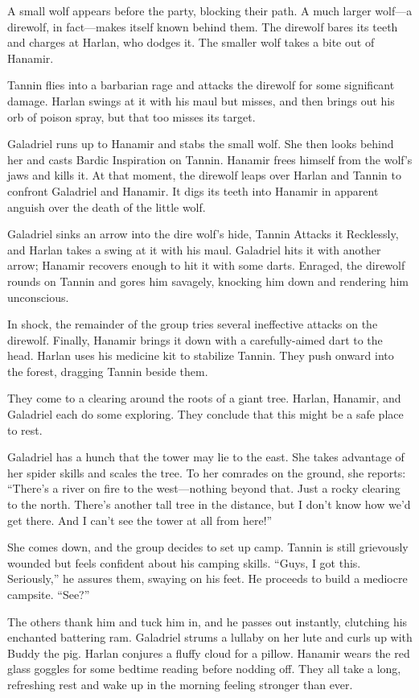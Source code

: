 \documentclass[smalldemyvopaper,11pt,twoside,onecolumn,openright,extrafontsizes]{memoir}
\begin{document}
A small wolf appears before the party, blocking their path. A much
larger wolf---a direwolf, in fact---makes itself known behind them. The
direwolf bares its teeth and charges at Harlan, who dodges it. The
smaller wolf takes a bite out of Hanamir.

Tannin flies into a barbarian rage and attacks the direwolf for some
significant damage. Harlan swings at it with his maul but misses, and
then brings out his orb of poison spray, but that too misses its target.

Galadriel runs up to Hanamir and stabs the small wolf. She then looks
behind her and casts Bardic Inspiration on Tannin. Hanamir frees himself
from the wolf's jaws and kills it. At that moment, the direwolf leaps
over Harlan and Tannin to confront Galadriel and Hanamir. It digs its
teeth into Hanamir in apparent anguish over the death of the little
wolf.

Galadriel sinks an arrow into the dire wolf's hide, Tannin Attacks it
Recklessly, and Harlan takes a swing at it with his maul. Galadriel hits
it with another arrow; Hanamir recovers enough to hit it with some
darts. Enraged, the direwolf rounds on Tannin and gores him savagely,
knocking him down and rendering him unconscious.

In shock, the remainder of the group tries several ineffective attacks
on the direwolf. Finally, Hanamir brings it down with a carefully-aimed
dart to the head. Harlan uses his medicine kit to stabilize Tannin. They
push onward into the forest, dragging Tannin beside them.

They come to a clearing around the roots of a giant tree. Harlan,
Hanamir, and Galadriel each do some exploring. They conclude that this
might be a safe place to rest.

Galadriel has a hunch that the tower may lie to the east. She takes
advantage of her spider skills and scales the tree. To her comrades on
the ground, she reports: ``There's a river on fire to the west---nothing
beyond that. Just a rocky clearing to the north. There's another tall
tree in the distance, but I don't know how we'd get there. And I can't
see the tower at all from here!''

She comes down, and the group decides to set up camp. Tannin is still
grievously wounded but feels confident about his camping skills. ``Guys,
I got this. Seriously,'' he assures them, swaying on his feet. He
proceeds to build a mediocre campsite. ``See?''

The others thank him and tuck him in, and he passes out instantly,
clutching his enchanted battering ram. Galadriel strums a lullaby on her
lute and curls up with Buddy the pig. Harlan conjures a fluffy cloud for
a pillow. Hanamir wears the red glass goggles for some bedtime reading
before nodding off. They all take a long, refreshing rest and wake up in
the morning feeling stronger than ever.
\end{document}
